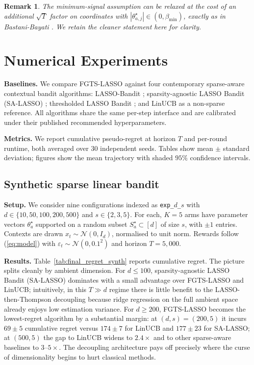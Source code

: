 \documentclass[journal,twoside,web]{ieeecolor}
\newtheorem{remark}{Remark}
\begin{document}
\begin{remark}
The minimum-signal assumption can be relaxed at the cost of an additional $\sqrt{T}$ factor on coordinates with $|\theta^\star_{a,j}| \in (0, \beta_{\min})$, exactly as in Bastani-Bayati \cite[Theorem~1]{bastani2020online}. We retain the cleaner statement here for clarity.
\end{remark}

\section{Numerical Experiments}\label{sec:experiments}

\textbf{Baselines.} We compare FGTS-LASSO against four contemporary sparse-aware contextual bandit algorithms: LASSO-Bandit \cite{bastani2020online}; sparsity-agnostic LASSO Bandit (SA-LASSO) \cite{oh2021sparsity}; thresholded LASSO Bandit \cite{ariu2022thresholded}; and LinUCB \cite{chu2011contextual} as a non-sparse reference. All algorithms share the same per-step interface and are calibrated under their published recommended hyperparameters.

\textbf{Metrics.} We report cumulative pseudo-regret at horizon $T$ and per-round runtime, both averaged over 30 independent seeds. Tables show mean $\pm$ standard deviation; figures show the mean trajectory with shaded $95\%$ confidence intervals.

\subsection{Synthetic sparse linear bandit}\label{sec:exp_synth}

\textbf{Setup.} We consider nine configurations indexed as \texttt{exp\_$d$\_$s$} with $d \in \{10,50,100,200,500\}$ and $s \in \{2,3,5\}$. For each, $K = 5$ arms have parameter vectors $\theta^{\star}_a$ supported on a random subset $S^{\star}_a \subset [d]$ of size $s$, with $\pm 1$ entries. Contexts are drawn $x_t \sim \mathcal{N}(0, I_d)$, normalised to unit norm. Rewards follow (\ref{eq:model}) with $\varepsilon_t \sim \mathcal{N}(0, 0.1^2)$ and horizon $T = 5{,}000$.

\textbf{Results.} Table~\ref{tab:final_regret_synth} reports cumulative regret. The picture splits cleanly by ambient dimension. For $d \leq 100$, sparsity-agnostic LASSO Bandit (SA-LASSO) dominates with a small advantage over FGTS-LASSO and LinUCB; intuitively, in this $T \gg d$ regime there is little benefit to the LASSO-then-Thompson decoupling because ridge regression on the full ambient space already enjoys low estimation variance. For $d \geq 200$, FGTS-LASSO becomes the lowest-regret algorithm by a substantial margin: at $(d, s) = (200, 5)$ it incurs $69 \pm 5$ cumulative regret versus $174 \pm 7$ for LinUCB and $177 \pm 23$ for SA-LASSO; at $(500, 5)$ the gap to LinUCB widens to $2.4\times$ and to other sparse-aware baselines to $3$--$5\times$. The decoupling architecture pays off precisely where the curse of dimensionality begins to hurt classical methods.
\end{document}
